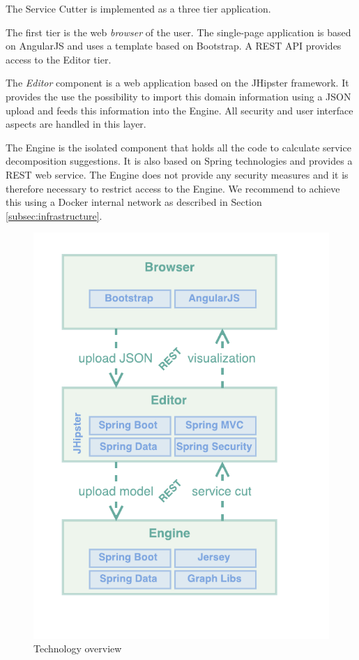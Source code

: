 \begin{minipage}[t]{0.5\textwidth}
	The Service Cutter is implemented as a three tier application.
	
	The first tier is the web \textit{browser} of the user. The single-page application is based on AngularJS\cite{angularjs} and uses a template based on Bootstrap\cite{bootstrap}. A REST API provides access to the Editor tier.
	
	The \textit{Editor} component is a web application based on the JHipster\cite{jhipster} framework. It provides the use the possibility to import this domain information using a JSON upload and feeds this information into the Engine. All security and user interface aspects are handled in this layer.
	
	The Engine is the isolated component that holds all the code to calculate service decomposition suggestions. It is also based on Spring technologies and provides a REST web service. The Engine does not provide any security measures and it is therefore necessary to restrict access to the Engine. We recommend to achieve this using a Docker\cite{docker} internal network as described in Section \ref{subsec:infrastructure}.
	
\end{minipage}
\begin{minipage}[t]{0.5\textwidth}
	\begin{figure}[H]
		\includegraphics[scale=1]{diagrams/Technologies.pdf}
		\caption{Technology overview}
		\label{fig:technologies}
	\end{figure}
\end{minipage}


